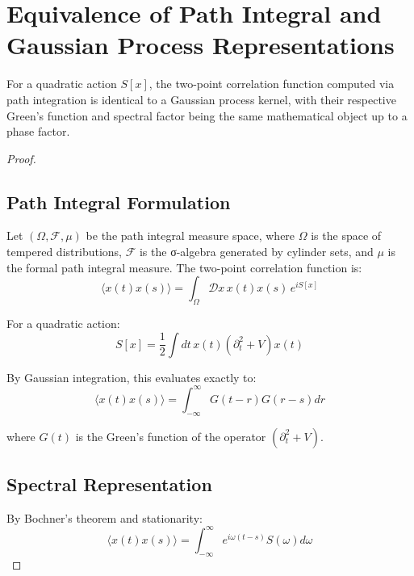 \documentclass{article}
\begin{document}
\section{Equivalence of Path Integral and Gaussian Process Representations}

\begin{theorem}
For a quadratic action $S[x]$, the two-point correlation function computed via path integration is identical to a Gaussian process kernel, with their respective Green's function and spectral factor being the same mathematical object up to a phase factor.
\end{theorem}

\begin{proof}

\subsection{Path Integral Formulation}

Let $(\Omega, \mathcal{F}, \mu)$ be the path integral measure space, where $\Omega$ is the space of tempered distributions, $\mathcal{F}$ is the σ-algebra generated by cylinder sets, and $\mu$ is the formal path integral measure. The two-point correlation function is:
\begin{equation}
    \langle x(t)x(s) \rangle = \int_{\Omega} \mathcal{D}x \, x(t)x(s) \, e^{iS[x]}
\end{equation}

For a quadratic action:
\begin{equation}
    S[x] = \frac{1}{2}\int dt \, x(t)(\partial_t^2 + V)x(t)
\end{equation}

By Gaussian integration, this evaluates exactly to:
\begin{equation}
    \langle x(t)x(s) \rangle = \int_{-\infty}^{\infty} G(t-r)G(r-s)dr
\end{equation}

where $G(t)$ is the Green's function of the operator $(\partial_t^2 + V)$.

\subsection{Spectral Representation}

By Bochner's theorem and stationarity:
\begin{equation}
    \langle x(t)x(s) \rangle = \int_{-\infty}^{\infty} e^{iω(t-s)} S(ω) dω
\end{equation}


\end{proof}
\end{document}
